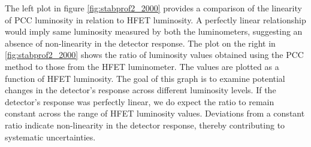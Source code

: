 \begin{itemize}


  

The left plot in figure \ref{fig:stabprof2_2000} provides a comparison of the linearity of PCC luminosity in relation to HFET luminosity. A perfectly linear relationship would imply same luminosity measured by both the luminometers, suggesting an absence of non-linearity in the detector response. The plot on the right in \ref{fig:stabprof2_2000} shows the ratio of luminosity values obtained using the PCC method to those from the HFET luminometer. The values are plotted as a function of HFET luminosity. The goal of this graph is to examine potential changes in the detector's response across different luminosity levels. If the detector's response was perfectly linear, we do expect the ratio to remain constant across the range of HFET luminosity values. Deviations from a constant ratio indicate non-linearity in the detector response, thereby contributing to systematic uncertainties.


\end{itemize}
